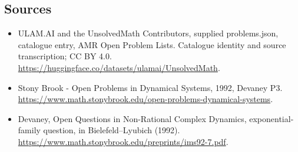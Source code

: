 \documentclass[11pt,a4paper]{article}
\begin{document}
\subsection{Sources}
\begin{itemize}
\item[S1] ULAM.AI and the UnsolvedMath Contributors, supplied problems.json, catalogue entry, AMR Open Problem Lists. Catalogue identity and source transcription; CC BY 4.0.
\url{https://huggingface.co/datasets/ulamai/UnsolvedMath}.
\item[S2] Stony Brook - Open Problems in Dynamical Systems, 1992, Devaney P3. 
\url{https://www.math.stonybrook.edu/open-problems-dynamical-systems}.
\item[S3] Devaney, Open Questions in Non-Rational Complex Dynamics, exponential-family question, in Bielefeld–Lyubich (1992).
\url{https://www.math.stonybrook.edu/preprints/ims92-7.pdf}.
\end{itemize}
\end{document}
